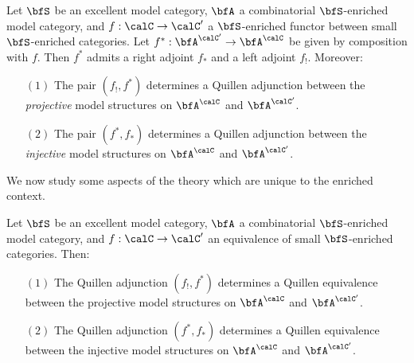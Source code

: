 \begin{Simplicial Categories}
\begin{proposition}\label{colbin}
Let $\bfS$ be an excellent model category, $\bfA$ a combinatorial $\bfS$-enriched
model category, and $f: \calC \rightarrow \calC'$ a $\bfS$-enriched functor between
small $\bfS$-enriched categories. Let
$f^{\ast}: \bfA^{\calC'} \rightarrow \bfA^{\calC}$ be given
by composition with $f$. Then $f^{\ast}$ admits a right adjoint
$f_{\ast}$ and a left adjoint $f_{!}$. Moreover:

\begin{itemize}
\item[$(1)$] The pair $( f_{!}, f^{\ast} )$ determines a Quillen
adjunction between the {\em projective} model structures on
$\bfA^{\calC}$ and $\bfA^{\calC'}$.

\item[$(2)$] The pair $( f^{\ast}, f_{\ast} )$ determines a
Quillen adjunction between the {\em injective} model structures on
$\bfA^{\calC}$ and $\bfA^{\calC'}$.
\end{itemize}
\end{proposition}

We now study some aspects of the theory which are unique to the enriched context.

\begin{proposition}\label{lesstrick}
Let $\bfS$ be an excellent model category,
$\bfA$ a combinatorial $\bfS$-enriched model category, and 
$f: \calC \rightarrow \calC'$ an equivalence of small $\bfS$-enriched categories. 
Then:

\begin{itemize}
\item[$(1)$] The Quillen adjunction $(f_{!}, f^{\ast})$ determines a Quillen equivalence between
the projective model structures on $\bfA^{\calC}$ and $\bfA^{\calC'}$. 

\item[$(2)$] The Quillen adjunction $(f^{\ast}, f_{\ast})$ determines a Quillen equivalence between
the injective model structures on $\bfA^{\calC}$ and $\bfA^{\calC'}$.
\end{itemize}

\end{proposition}




\end{Simplicial Categories}

